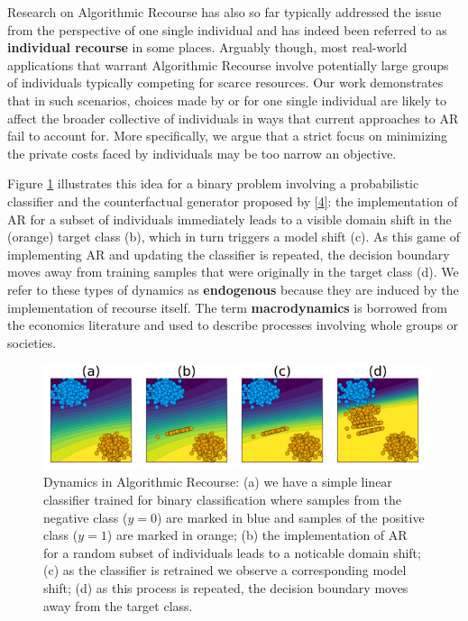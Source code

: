 \documentclass[conference,final,]{IEEEtran}
\theoremstyle{definition}
\theoremstyle{definition}
\theoremstyle{definition}
\theoremstyle{definition}
\theoremstyle{remark}
\begin{document}
Research on Algorithmic Recourse has also so far typically addressed the issue from the perspective of one single individual and has indeed been referred to as \textbf{individual recourse} in some places. Arguably though, most real-world applications that warrant Algorithmic Recourse involve potentially large groups of individuals typically competing for scarce resources. Our work demonstrates that in such scenarios, choices made by or for one single individual are likely to affect the broader collective of individuals in ways that current approaches to AR fail to account for. More specifically, we argue that a strict focus on minimizing the private costs faced by individuals may be too narrow an objective.

Figure \ref{fig:poc} illustrates this idea for a binary problem involving a probabilistic classifier and the counterfactual generator proposed by \protect\hyperlink{ref-wachter2017counterfactual}{{[}4{]}}: the implementation of AR for a subset of individuals immediately leads to a visible domain shift in the (orange) target class (b), which in turn triggers a model shift (c). As this game of implementing AR and updating the classifier is repeated, the decision boundary moves away from training samples that were originally in the target class (d). We refer to these types of dynamics as \textbf{endogenous} because they are induced by the implementation of recourse itself. The term \textbf{macrodynamics} is borrowed from the economics literature and used to describe processes involving whole groups or societies.

\begin{figure}

{\centering \includegraphics[width=0.9\linewidth]{www/poc} 

}

\caption{Dynamics in Algorithmic Recourse: (a) we have a simple linear classifier trained for binary classification where samples from the negative class ($y=0$) are marked in blue and samples of the positive class ($y=1$) are marked in orange; (b) the implementation of AR for a random subset of individuals leads to a noticable domain shift; (c) as the classifier is retrained we observe a corresponding model shift; (d) as this process is repeated, the decision boundary moves away from the target class.}\label{fig:poc}
\end{figure}
\end{document}
